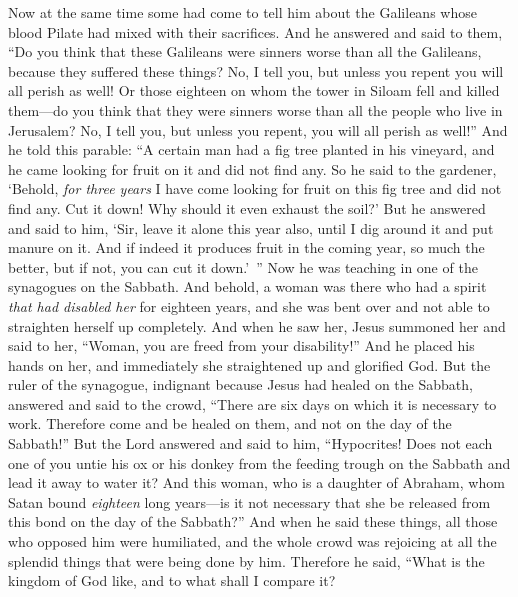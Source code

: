 \begin{biblechapter} %
 Now at the same time some had come to tell him about the Galileans whose blood Pilate had mixed with their sacrifices.
\verse And he answered and said to them, “Do you think that these Galileans were sinners worse than all the Galileans, because they suffered these things?
\verse No, I tell you, but unless you repent you will all perish as well!
\verse Or those eighteen on whom the tower in Siloam fell and killed them—do you think that they were sinners worse than all the people who live in Jerusalem?
\verse No, I tell you, but unless you repent, you will all perish as well!”
 And he told this parable: “A certain man had a fig tree planted in his vineyard, and he came looking for fruit on it and did not find any.
\verse So he said to the gardener, ‘Behold, \textit{for three years} I have come looking for fruit on this fig tree and did not find any. Cut it down! Why should it even exhaust the soil?’
\verse But he answered and said to him, ‘Sir, leave it alone this year also, until I dig around it and put manure on it.
\verse And if indeed it produces fruit in the coming year, so much the better, but if not, you can cut it down.’ ”
 Now he was teaching in one of the synagogues on the Sabbath.
\verse And behold, a woman was there who had a spirit \textit{that had disabled her} for eighteen years, and she was bent over and not able to straighten herself up completely.
\verse And when he saw her, Jesus summoned her and said to her, “Woman, you are freed from your disability!”
\verse And he placed his hands on her, and immediately she straightened up and glorified God.
\verse But the ruler of the synagogue, indignant because Jesus had healed on the Sabbath, answered and said to the crowd, “There are six days on which it is necessary to work. Therefore come and be healed on them, and not on the day of the Sabbath!”
\verse But the Lord answered and said to him, “Hypocrites! Does not each one of you untie his ox or his donkey from the feeding trough on the Sabbath and lead it away to water it?
\verse And this woman, who is a daughter of Abraham, whom Satan bound \textit{eighteen} long years—is it not necessary that she be released from this bond on the day of the Sabbath?”
\verse And when he said these things, all those who opposed him were humiliated, and the whole crowd was rejoicing at all the splendid things that were being done by him.
 Therefore he said, “What is the kingdom of God like, and to what shall I compare it?

\end{biblechapter}
